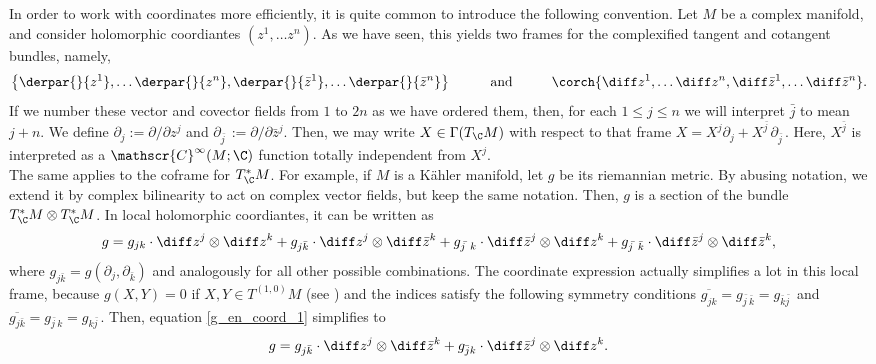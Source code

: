 \begin{obs}
    In order to work with coordinates more efficiently, it is quite common to introduce the following convention. Let \(M\) be a complex manifold, and consider holomorphic coordiantes \((z^1, \ldots z^n)\). As we have seen, this yields two frames for the complexified tangent and cotangent bundles, namely, 
    \[
    \left\lbrace \derpar{}{z^1}, \ldots \derpar{}{z^n}, \derpar{}{\bar{z}^1}, \dots \derpar{}{\bar{z}^n} \right\rbrace \hspace{1 cm} \text{and} \hspace{1 cm}
    \corch{\diff z^1, \ldots \diff z^n, \diff \bar{z}^1, \ldots \diff \bar{z}^n}. 
    \]
    If we number these vector and covector fields from \(1\) to \(2n\) as we have ordered them, then, for each \(1 \leq j \leq n\) we will interpret \(\bar{j}\) to mean \(j+n\). We define \(\partial_j:=\partial/\partial z^j\) and \(\partial_{\bar{j \ }}:=\partial/\partial \bar{z}^j\). Then, we may write \(X \in \Gamma(T_\C M)\) with respect to that frame \(X=X^j \partial_j+X^{\bar{j\ }} \partial_{\bar{j \ }}\). Here, \(X^{\bar{j}}\) is interpreted as a \(\mathscr{C}^\infty(M;\C)\) function totally independent from \(X^j\). \\
    
    The same applies to the coframe for \(T_\C^*M\). For example, if \(M\) is a Kähler manifold, let \(g\) be its riemannian metric. By abusing notation, we extend it by complex bilinearity to act on complex vector fields, but keep the same notation. Then, \(g\) is a section of the bundle \(T_\C^*M \otimes T_\C^*M\). In local holomorphic coordiantes, it can be written as
    \begin{equation} \label{g_en_coord_1}
    g=g_{jk} \cdot \diff z^j \otimes \diff z^k+g_{j \bar{k}} \cdot \diff z^j \otimes \diff \bar{z}^k+g_{\bar{j \ } k} \cdot \diff \bar{z}^j \otimes \diff z^k+g_{\bar{j \ }\bar{k}} \cdot \diff \bar{z}^j \otimes \diff \bar{z}^k,
    \end{equation}
    where \(g_{j\bar{k}}=g(\partial_j, \partial_{\bar{k}})\) and analogously for all other possible combinations. The coordinate expression actually simplifies a lot in this local frame, because \(g(X,Y)=0\) if \(X,Y \in T^{(1,0)}M\) (see \parencite[Prop. 8.4]{lee_introCM}) and the indices satisfy the following symmetry conditions \(\overline{g_{jk}}=g_{\bar{j \ }\bar{k}}=g_{\bar{k} \bar{j \ }}\) and \(\overline{g_{j \bar{k}}}=g_{\bar{j \ }k}=g_{k \bar{j \ }}\). Then, equation \eqref{g_en_coord_1} simplifies to
    \[
    g=g_{j\bar{k}}\cdot \diff z^j \otimes \diff \bar{z}^k+g_{\bar{j}k} \cdot \diff \bar{z}^j \otimes \diff z^k.
    \]
\end{obs}
